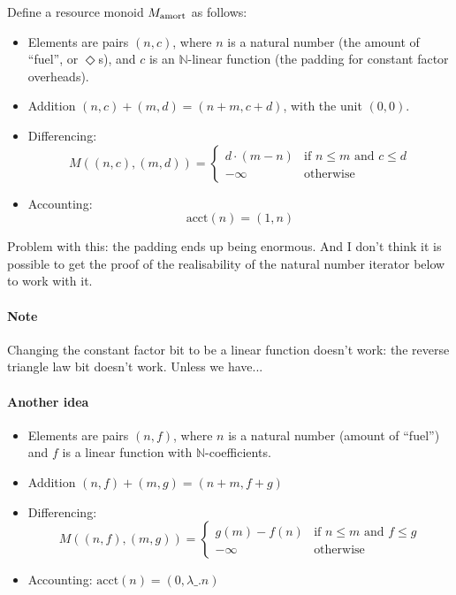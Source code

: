 \documentclass{workingnote}
\newcommand{\account}{\mathrm{acct}}
\begin{document}
Define a resource monoid $M_{\mathrm{amort}}$ as follows:
\begin{itemize}
\item Elements are pairs $(n, c)$, where $n$ is a natural number (the
  amount of ``fuel'', or $\Diamond$s), and $c$ is an
  $\mathbb{N}$-linear function (the padding for constant factor
  overheads).
\item Addition $(n,c) + (m,d) = (n+m,c+d)$, with the unit $(0,0)$.
\item Differencing:
  \begin{displaymath}
    M((n,c),(m,d)) = \left\{\begin{array}{ll} d \cdot (m-n) & \textrm{if }n\leq m\textrm{ and }c \leq d \\ -\infty & \textrm{otherwise} \end{array}\right.
  \end{displaymath}
\item Accounting:
  \begin{displaymath}
    \account(n) = (1,n)
  \end{displaymath}
\end{itemize}
Problem with this: the padding ends up being enormous. And I don't
think it is possible to get the proof of the realisability of the
natural number iterator below to work with it.

\paragraph{Note} Changing the constant factor bit to be a linear
function doesn't work: the reverse triangle law bit doesn't
work. Unless we have...

\paragraph{Another idea}
\begin{itemize}
\item Elements are pairs $(n, f)$, where $n$ is a natural number
  (amount of ``fuel'') and $f$ is a linear function with
  $\mathbb{N}$-coefficients.
\item Addition $(n,f) + (m,g) = (n+m,f+g)$
\item Differencing:
  \begin{displaymath}
    M((n,f),(m,g)) = \left\{\begin{array}{ll} g(m) - f(n) & \textrm{if }n \leq m\textrm{ and }f \leq g \\ -\infty & \textrm{otherwise} \end{array}\right.
  \end{displaymath}
\item Accounting: $\account(n) = (0, \lambda \_. n)$
\end{itemize}
\end{document}
